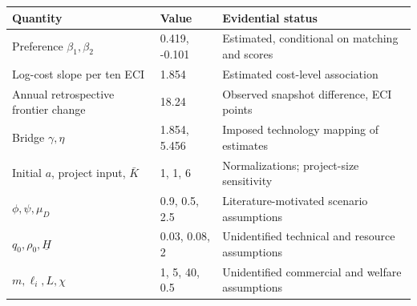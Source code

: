 \begin{tabular}{p{}p{}p{}}
\toprule
Quantity & Value & Evidential status \\
\midrule
Preference $\beta_1,\beta_2$ & 0.419, -0.101 & Estimated, conditional on matching and scores \\
Log-cost slope per ten ECI & 1.854 & Estimated cost-level association \\
Annual retrospective frontier change & 18.24 & Observed snapshot difference, ECI points \\
Bridge $\gamma,\eta$ & 1.854, 5.456 & Imposed technology mapping of estimates \\
Initial $a$, project input, $\bar K$ & 1, 1, 6 & Normalizations; project-size sensitivity \\
$\phi,\psi,\mu_D$ & 0.9, 0.5, 2.5 & Literature-motivated scenario assumptions \\
$q_0,\rho_0,\underline H$ & 0.03, 0.08, 2 & Unidentified technical and resource assumptions \\
$m,\ell_i,L,\chi$ & 1, 5, 40, 0.5 & Unidentified commercial and welfare assumptions \\
\bottomrule
\end{tabular}
